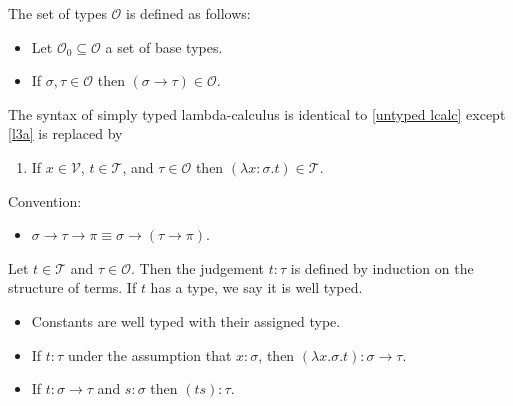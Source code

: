 \documentclass{article}
\begin{document}
\begin{definition}
	\label{simply typed lcalc}
	The set of types $\mathcal{O}$ is defined as follows:
	\begin{itemize}
		\item Let $\mathcal{O}_0\subseteq\mathcal{O}$ a set of base types.
		\item If $\sigma,\tau\in\mathcal{O}$ then $(\sigma\to\tau)\in\mathcal{O}$.
	\end{itemize}	
	The syntax of simply typed lambda-calculus is identical to \ref{untyped lcalc} except \ref{l3a}
	is replaced by 
	\begin{enumerate}[label=L3'.]
		\item \label{l3b} If $x\in\mathcal{V}$, $t\in\mathcal{T}$, and $\tau\in\mathcal{O}$ then 
			$(\lambda x:\sigma. t) \in\mathcal{T}$.
	\end{enumerate} 
	Convention:
	\begin{itemize}
		\item $\sigma\to\tau\to\pi\equiv \sigma\to(\tau\to\pi)$.
	\end{itemize}
\end{definition}

\begin{definition*}[Judgement]
	Let $t\in\mathcal{T}$ and $\tau\in\mathcal{O}$. Then the judgement $t:\tau$ is defined by
	induction on the structure of terms. If $t$ has a type, we say it is well typed.
	\begin{itemize}
		\item Constants are well typed with their assigned type.
		\item If $t:\tau$ under the assumption that $x:\sigma$, then $(\lambda x. \sigma.t):\sigma\to\tau$.
		\item If $t:\sigma\to\tau$ and $s:\sigma$ then $(ts):\tau$.
	\end{itemize}
\end{definition*}
\end{document}

